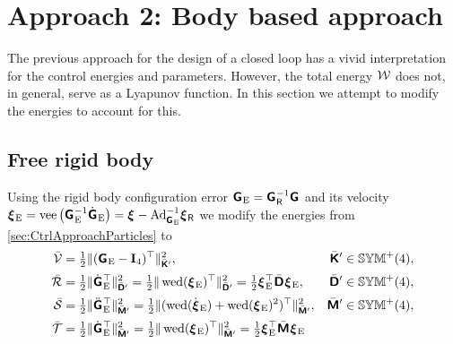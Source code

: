 \section{Approach 2: Body based approach}\label{sec:CtrlApproachBody}
The previous approach for the design of a closed loop has a vivid interpretation for the control energies and parameters.
However, the total energy $\mathcal{W}$ does not, in general, serve as a Lyapunov function.
In this section we attempt to modify the energies to account for this.

\subsection{Free rigid body}\label{sec:CtrlApproachBodySingleBody}
Using the rigid body configuration error $\bodyHomoCoordE{}{} = \bodyHomoCoordR{}{}^{-1} \bodyHomoCoord{}{}$ and its velocity $\bodyVelE{}{} = \veeOp\big(\bodyHomoCoordE{}{}^{-1} \bodyHomoCoordEd{}{}\big) = \bodyVel{}{} - \Ad{\bodyHomoCoordE{}{}}^{-1} \bodyVelR{}{}$ we modify the energies from \autoref{sec:CtrlApproachParticles} to
\begin{subequations}\label{eq:RBCtrlEnergiesBody}
\begin{align}
 \potentialEnergyC 
 &= \tfrac{1}{2} \norm[\bodyStiffMatCp{}{}]{ (\bodyHomoCoordE{}{} - \idMat[4] )^\top}^2,&
 \bodyStiffMatCp{}{} &\in \SymMatP(4),
\\
 \dissFktC 
 &= \tfrac{1}{2} \norm[\bodyDissMatCp{}{}]{\bodyHomoCoordEd{}{}^\top}^2
  = \tfrac{1}{2} \norm[\bodyDissMatCp{}{}]{\wedOp(\bodyVelE{}{})^\top}^2
  = \tfrac{1}{2} \bodyVelE{}{}^\top \bodyDissMatC{}{} \bodyVelE{}{},&
 \bodyDissMatCp{}{} &\in \SymMatP(4),
\\
 \accEnergyC 
 &= \tfrac{1}{2} \norm[\bodyInertiaMatCp{}{}]{\bodyHomoCoordEdd{}{}^\top}^2
  = \tfrac{1}{2} \norm[\bodyInertiaMatCp{}{}]{(\wedOp(\bodyVelEd{}{}) + \wedOp(\bodyVelE{}{})^2)^\top}^2,&
 \bodyInertiaMatCp{}{} &\in \SymMatP(4),
\\
 \kineticEnergyC
 &= \tfrac{1}{2} \norm[\bodyInertiaMatCp{}{}]{\bodyHomoCoordEd{}{}^\top}^2
  = \tfrac{1}{2} \norm[\bodyInertiaMatCp{}{}]{\wedOp(\bodyVelE{}{})^\top}^2
  = \tfrac{1}{2} \bodyVelE{}{}^\top \bodyInertiaMatC{}{} \bodyVelE{}{}
\end{align}
\end{subequations}

